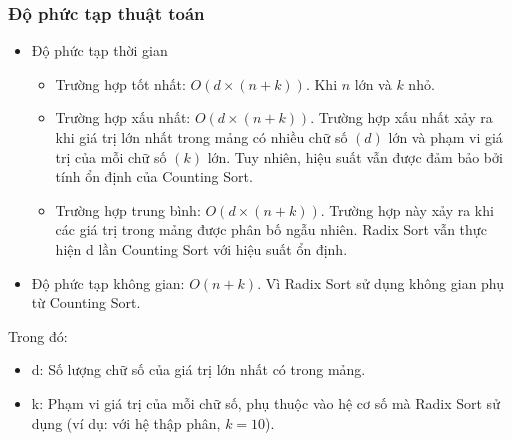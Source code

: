 \begin{center}
\end{center}

\subsubsection{Độ phức tạp thuật toán}

\begin{itemize}
    \item Độ phức tạp thời gian \cite[p.~213]{cormen2022}
    \begin{itemize}[label=$\circ$]
        \item Trường hợp tốt nhất: $O\left(d\times\left(n+k\right)\right)$. 
        Khi $n$ lớn và $k$ nhỏ. 
        \item Trường hợp xấu nhất: $O\left(d\times\left(n+k\right)\right)$. 
        Trường hợp xấu nhất xảy ra khi giá trị lớn nhất trong mảng có nhiều 
        chữ số $(d)$ lớn và phạm vi giá trị của mỗi chữ số $(k)$ lớn. Tuy nhiên, 
        hiệu suất vẫn được đảm bảo bởi tính ổn định của Counting Sort.
        \item Trường hợp trung bình: $O\left(d\times\left(n+k\right)\right)$. 
        Trường hợp này xảy ra khi các giá trị trong mảng được phân bố ngẫu nhiên. 
        Radix Sort vẫn thực hiện d lần Counting Sort với hiệu suất ổn định.
    \end{itemize}
    
    \item Độ phức tạp không gian: $O\left(n+k\right)$. Vì Radix Sort 
    sử dụng không gian phụ từ Counting Sort.

\end{itemize}

Trong đó:

\begin{itemize}[label=$\circ$]
    \item d: Số lượng chữ số của giá trị lớn nhất có trong mảng.
    \item k: Phạm vi giá trị của mỗi chữ số, phụ thuộc vào hệ cơ số 
    mà Radix Sort sử dụng (ví dụ: với hệ thập phân, $k=10$).
\end{itemize}